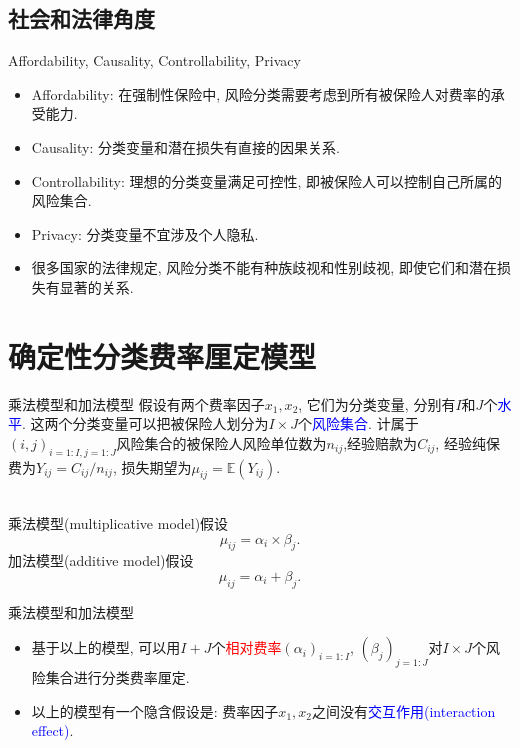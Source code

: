 \documentclass[professionalfont]{beamer}
\def\E{{\mathbb E}}
\newcommand{\red}[1]{\textcolor{red}{#1}}
\newcommand{\blue}[1]{\textcolor{blue}{#1}}
\begin{document}
\subsection{社会和法律角度}
\begin{frame}{Affordability, Causality, Controllability, Privacy}
\begin{itemize}
	\item	Affordability: 在强制性保险中, 风险分类需要考虑到所有被保险人对费率的承受能力.
	\item	Causality: 分类变量和潜在损失有直接的因果关系.
	\item	Controllability: 理想的分类变量满足可控性, 即被保险人可以控制自己所属的风险集合. 
	\item Privacy: 分类变量不宜涉及个人隐私. 
	\item	很多国家的法律规定, 风险分类不能有种族歧视和性别歧视, 即使它们和潜在损失有显著的关系.
\end{itemize}
\end{frame}

\section{确定性分类费率厘定模型}
\begin{frame}{乘法模型和加法模型}
	假设有两个费率因子$x_1, x_2$, 它们为分类变量, 分别有$I$和$J$个\blue{水平}. 这两个分类变量可以把被保险人划分为$I\times J$个\blue{风险集合}. 计属于$(i,j)_{i=1:I, j=1:J}$风险集合的被保险人风险单位数为$n_{ij}$,经验赔款为$C_{ij}$, 经验纯保费为$Y_{ij}=C_{ij}/n_{ij}$, 损失期望为$\mu_{ij}=\E(Y_{ij})$.\\
	
	~
	
	乘法模型(multiplicative model)假设
	$$\mu_{ij}=\alpha_i\times\beta_j.$$
	加法模型(additive model)假设
	$$\mu_{ij}=\alpha_i+\beta_j.$$
\end{frame}
\begin{frame}{乘法模型和加法模型}
	\begin{itemize}
		\item 基于以上的模型, 可以用$I+J$个\red{相对费率}$(\alpha_{i})_{i=1:I}$, $(
		\beta_{j})_{j=1:J}$对$I\times J$个风险集合进行分类费率厘定.
		\item 以上的模型有一个隐含假设是: 费率因子$x_1,x_2$之间没有\blue{交互作用(interaction effect)}.
\end{itemize}
\end{frame}
\end{document}
